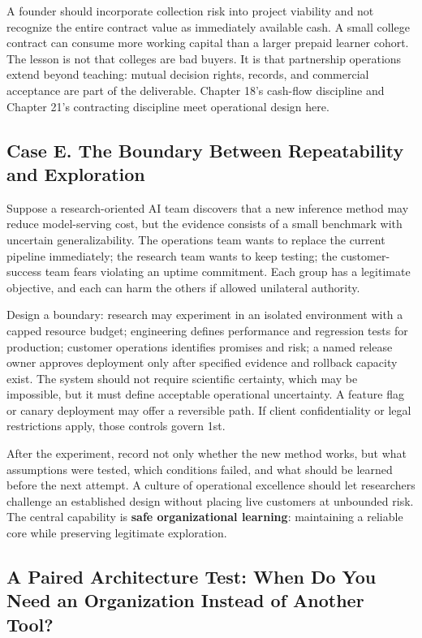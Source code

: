 A founder should incorporate collection risk into project viability and not recognize the entire contract value as immediately available cash. A small college contract can consume more working capital than a larger prepaid learner cohort. The lesson is not that colleges are bad buyers. It is that partnership operations extend beyond teaching: mutual decision rights, records, and commercial acceptance are part of the deliverable. Chapter 18's cash-flow discipline and Chapter 21's contracting discipline meet operational design here.

\subsection*{Case E. The Boundary Between Repeatability and Exploration}

Suppose a research-oriented AI team discovers that a new inference method may reduce model-serving cost, but the evidence consists of a small benchmark with uncertain generalizability. The operations team wants to replace the current pipeline immediately; the research team wants to keep testing; the customer-success team fears violating an uptime commitment. Each group has a legitimate objective, and each can harm the others if allowed unilateral authority.

Design a boundary: research may experiment in an isolated environment with a capped resource budget; engineering defines performance and regression tests for production; customer operations identifies promises and risk; a named release owner approves deployment only after specified evidence and rollback capacity exist. The system should not require scientific certainty, which may be impossible, but it must define acceptable operational uncertainty. A feature flag or canary deployment may offer a reversible path. If client confidentiality or legal restrictions apply, those controls govern 1st.

After the experiment, record not only whether the new method works, but what assumptions were tested, which conditions failed, and what should be learned before the next attempt. A culture of operational excellence should let researchers challenge an established design without placing live customers at unbounded risk. The central capability is \textbf{safe organizational learning}: maintaining a reliable core while preserving legitimate exploration.

\subsection*{A Paired Architecture Test: When Do You Need an Organization Instead of Another Tool?}


